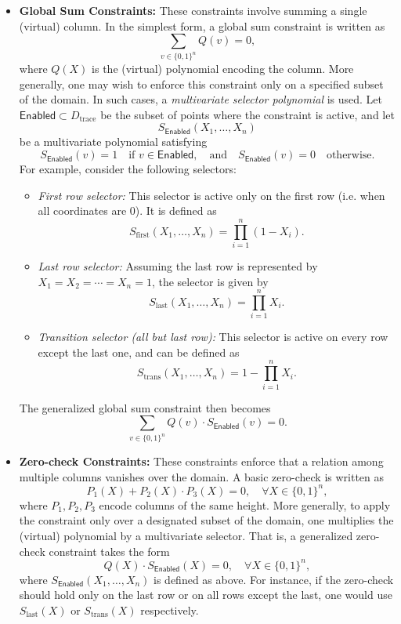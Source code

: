 \documentclass{article}
\begin{document}
\begin{itemize}
    \item \textbf{Global Sum Constraints:} These constraints involve summing a single (virtual) column. In the simplest form, a global sum constraint is written as
    \[
    \sum_{v \in \{0, 1\}^n} Q(v) = 0,
    \]
    where \( Q(X) \) is the (virtual) polynomial encoding the column. More generally, one may wish to enforce this constraint only on a specified subset of the domain. In such cases, a \emph{multivariate selector polynomial} is used. Let \(\mathsf{Enabled} \subset D_{\text{trace}}\) be the subset of points where the constraint is active, and let
    \[
    S_{\mathsf{Enabled}}(X_1,\ldots,X_n)
    \]
    be a multivariate polynomial satisfying
    \[
    S_{\mathsf{Enabled}}(v)=1 \quad \text{if } v\in \mathsf{Enabled}, \quad \text{and} \quad S_{\mathsf{Enabled}}(v)=0 \quad \text{otherwise.}
    \]
    For example, consider the following selectors:
    \begin{itemize}
        \item \emph{First row selector:} This selector is active only on the first row (i.e. when all coordinates are 0). It is defined as
        \[
        S_{\text{first}}(X_1,\dots,X_n) = \prod_{i=1}^n (1-X_i).
        \]
        \item \emph{Last row selector:} Assuming the last row is represented by \( X_1=X_2=\cdots=X_n=1 \), the selector is given by
        \[
        S_{\text{last}}(X_1,\dots,X_n) = \prod_{i=1}^n X_i.
        \]
        \item \emph{Transition selector (all but last row):} This selector is active on every row except the last one, and can be defined as
        \[
        S_{\text{trans}}(X_1,\dots,X_n) = 1 - \prod_{i=1}^n X_i.
        \]
    \end{itemize}
    The generalized global sum constraint then becomes
    \[
    \sum_{v \in \{0, 1\}^n} Q(v) \cdot S_{\mathsf{Enabled}}(v) = 0.
    \]
    
    \item \textbf{Zero-check Constraints:} These constraints enforce that a relation among multiple columns vanishes over the domain. A basic zero-check is written as
    \[
    P_1(X) + P_2(X) \cdot P_3(X) = 0,\quad \forall X \in \{0, 1\}^n,
    \]
    where \( P_1, P_2, P_3 \) encode columns of the same height. More generally, to apply the constraint only over a designated subset of the domain, one multiplies the (virtual) polynomial by a multivariate selector. That is, a generalized zero-check constraint takes the form
    \[
    Q(X) \cdot S_{\mathsf{Enabled}}(X) = 0,\quad \forall X \in \{0, 1\}^n,
    \]
    where \( S_{\mathsf{Enabled}}(X_1,\ldots,X_n) \) is defined as above. For instance, if the zero-check should hold only on the last row or on all rows except the last, one would use \( S_{\text{last}}(X) \) or \( S_{\text{trans}}(X) \) respectively.
    
\end{itemize}
\end{document}
